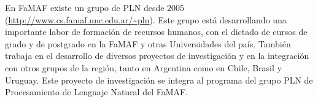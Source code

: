 En FaMAF existe un grupo de PLN desde 2005 (\url{http://www.cs.famaf.unc.edu.ar/~pln}). Este
grupo est\'a desarrollando una importante labor de formaci\'on de recursos humanos, con el dictado de cursos de grado y de postgrado en la FaMAF y otras Universidades del pa\'is.
Tambi\'en trabaja en el desarrollo de diversos proyectos de investigaci\'on y en la integraci\'on
con otros grupos de la regi\'on, tanto en Argentina como en Chile, Brasil y Uruguay. Este proyecto de investigaci\'on se integra al programa del grupo PLN de Procesamiento de Lenguaje Natural del
FaMAF.


